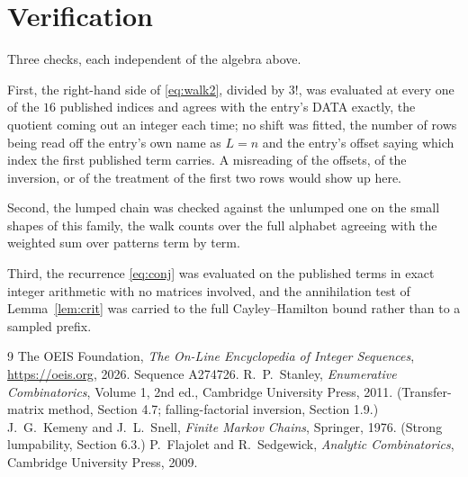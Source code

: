 \documentclass[11pt,a4paper]{article}
\theoremstyle{plain}
\theoremstyle{definition}
\begin{document}
\section{Verification}

Three checks, each independent of the algebra above.

First, the right-hand side of \eqref{eq:walk2}, divided by $3!$, was evaluated at every
one of the $16$ published indices and agrees with the entry's DATA exactly, the quotient
coming out an integer each time; no shift was fitted, the number of rows being read off the
entry's own name as $L=n$ and the entry's offset saying which index the first published
term carries. A misreading of the offsets, of the inversion, or of the treatment of the first
two rows would show up here.

Second, the lumped chain was checked against the unlumped one on the small shapes of this
family, the walk counts over the full alphabet agreeing with the weighted sum over patterns
term by term.

Third, the recurrence \eqref{eq:conj} was evaluated on the published terms in exact integer
arithmetic with no matrices involved, and the annihilation test of Lemma~\ref{lem:crit} was
carried to the full Cayley--Hamilton bound rather than to a sampled prefix.

\begin{thebibliography}{9}
 The OEIS Foundation, \emph{The On-Line Encyclopedia of Integer
Sequences}, \url{https://oeis.org}, 2026. Sequence A274726.
 R.~P.~Stanley, \emph{Enumerative Combinatorics}, Volume 1, 2nd ed.,
Cambridge University Press, 2011. (Transfer-matrix method, Section 4.7; falling-factorial
inversion, Section 1.9.)
 J.~G.~Kemeny and J.~L.~Snell, \emph{Finite Markov Chains}, Springer,
1976. (Strong lumpability, Section 6.3.)
 P.~Flajolet and R.~Sedgewick, \emph{Analytic Combinatorics}, Cambridge
University Press, 2009.
\end{thebibliography}
\end{document}
